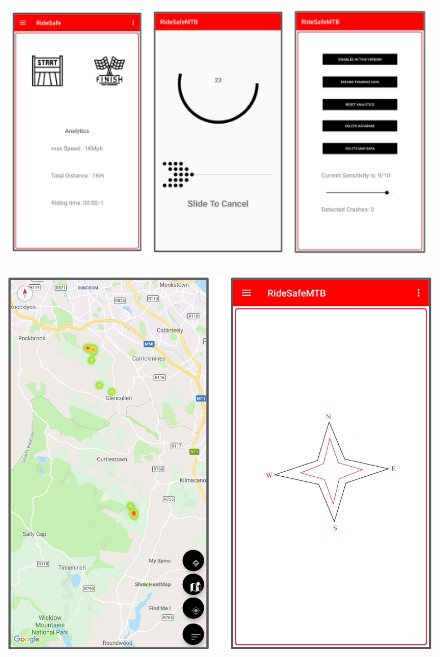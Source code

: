 \begin{figure}[h]
      \centering
      \includegraphics[scale = .9]{appendix/2.png}
      \caption{}
      \label{2}
\end{figure}




\begin{figure}[h]
      \centering
      \includegraphics[scale = .9]{appendix/3.png}
      \caption{}
      \label{cm}
\end{figure}
